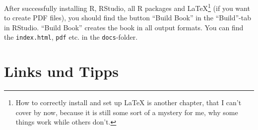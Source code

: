 \documentclass[]{book}
\let\rmarkdownfootnote\footnote%
\def\footnote{\protect\rmarkdownfootnote}
\theoremstyle{definition}
\theoremstyle{definition}
\theoremstyle{remark}
\begin{document}
After successfully installing R, RStudio, all R packages and
LaTeX\footnote{How to correctly install and set up LaTeX is another
  chapter, that I can't cover by now, because it is still some sort of a
  mystery for me, why some things work while others don't.} (if you want
to create PDF files), you should find the button ``Build Book'' in the
``Build''-tab in RStudio. ``Build Book'' creates the book in all output
formats. You can find the \texttt{index.html}, \texttt{pdf} etc. in the
\texttt{docs}-folder.

\hypertarget{links-und-tipps}{\section*{Links und
Tipps}\label{links-und-tipps}}
\end{document}
